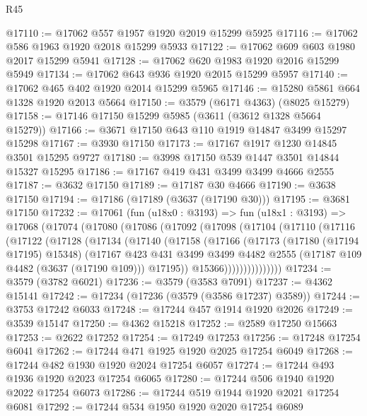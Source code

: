 \begin{lexlean}{R45}
\begin{coremodule}
@17110 := @17062 @557 @1957 @1920 @2019 @15299 @5925
@17116 := @17062 @586 @1963 @1920 @2018 @15299 @5933
@17122 := @17062 @609 @603 @1980 @2017 @15299 @5941
@17128 := @17062 @620 @1983 @1920 @2016 @15299 @5949
@17134 := @17062 @643 @936 @1920 @2015 @15299 @5957
@17140 := @17062 @465 @402 @1920 @2014 @15299 @5965
@17146 := @15280 @5861 @664 @1328 @1920 @2013 @5664
@17150 := @3579 (@6171 @4363) (@8025 @15279)
@17158 := @17146 @17150 @15299 @5985 (@3611 (@3612 @1328 @5664 @15279))
@17166 := @3671 @17150 @643 @110 @1919 @14847 @3499 @15297 @15298
@17167 := @3930 @17150
@17173 := @17167 @1917 @1230 @14845 @3501 @15295 @9727
@17180 := @3998 @17150 @539 @1447 @3501 @14844 @15327 @15295
@17186 := @17167 @419 @431 @3499 @3499 @4666 @2555
@17187 := @3632 @17150
@17189 := @17187 @30 @4666
@17190 := @3638 @17150
@17194 := @17186 (@17189 (@3637 (@17190 @30)))
@17195 := @3681 @17150
@17232 := @17061
    (fun (u18x0 : @3193) =>
    fun (u18x1 : @3193) =>
    @17068
      (@17074
        (@17080
          (@17086
            (@17092
              (@17098
                (@17104
                  (@17110
                    (@17116
                      (@17122
                        (@17128
                          (@17134
                            (@17140
                              (@17158
                                (@17166
                                  (@17173
                                    (@17180 (@17194 @17195) @15348)
                                    (@17167
                                      @423
                                      @431
                                      @3499
                                      @3499
                                      @4482
                                      @2555
                                      (@17187 @109 @4482 (@3637 (@17190 @109)))
                                      @17195))
                                  @15366)))))))))))))))
@17234 := @3579 (@3782 @6021)
@17236 := @3579 (@3583 @7091)
@17237 := @4362 @15141
@17242 := @17234 (@17236 (@3579 (@3586 @17237) @3589))
@17244 := @3753 @17242 @6033
@17248 := @17244 @457 @1914 @1920 @2026
@17249 := @3539 @15147
@17250 := @4362 @15218
@17252 := @2589 @17250 @15663
@17253 := @2622 @17252
@17254 := @17249 @17253
@17256 := @17248 @17254 @6041
@17262 := @17244 @471 @1925 @1920 @2025 @17254 @6049
@17268 := @17244 @482 @1930 @1920 @2024 @17254 @6057
@17274 := @17244 @493 @1936 @1920 @2023 @17254 @6065
@17280 := @17244 @506 @1940 @1920 @2022 @17254 @6073
@17286 := @17244 @519 @1944 @1920 @2021 @17254 @6081
@17292 := @17244 @534 @1950 @1920 @2020 @17254 @6089

\end{coremodule}
\end{lexlean}
